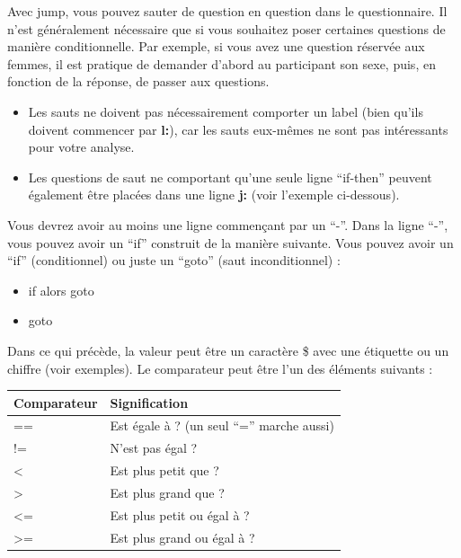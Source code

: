 \documentclass[
]{book}
\providecommand{\tightlist}{%
  \setlength{\itemsep}{0pt}\setlength{\parskip}{0pt}}
\begin{document}
Avec jump, vous pouvez sauter de question en question dans le questionnaire. Il n'est généralement nécessaire que si vous souhaitez poser certaines questions de manière conditionnelle. Par exemple, si vous avez une question réservée aux femmes, il est pratique de demander d'abord au participant son sexe, puis, en fonction de la réponse, de passer aux questions.

\begin{itemize}
\tightlist
\item
  Les sauts ne doivent pas nécessairement comporter un label (bien qu'ils doivent commencer par \textbf{l:}), car les sauts eux-mêmes ne sont pas intéressants pour votre analyse.
\item
  Les questions de saut ne comportant qu'une seule ligne ``if-then'' peuvent également être placées dans une ligne \textbf{j:} (voir l'exemple ci-dessous).
\end{itemize}

Vous devrez avoir au moins une ligne commençant par un ``-''. Dans la ligne ``-'', vous pouvez avoir un ``if'' construit de la manière suivante. Vous pouvez avoir un ``if'' (conditionnel) ou juste un ``goto'' (saut inconditionnel) :

\begin{itemize}
\tightlist
\item
  if alors goto 
\item
  goto 
\end{itemize}

Dans ce qui précède, la valeur peut être un caractère \$ avec une étiquette ou un chiffre (voir exemples). Le comparateur peut être l'un des éléments suivants :

\begin{longtable}[]{@{}ll@{}}
\toprule
Comparateur & Signification\tabularnewline
\midrule
\endhead
== & Est égale à ? (un seul ``='' marche aussi)\tabularnewline
!= & N'est pas égal ?\tabularnewline
\textless{} & Est plus petit que ?\tabularnewline
\textgreater{} & Est plus grand que ?\tabularnewline
\textless= & Est plus petit ou égal à ?\tabularnewline
\textgreater= & Est plus grand ou égal à ?\tabularnewline
\bottomrule
\end{longtable}
\end{document}
